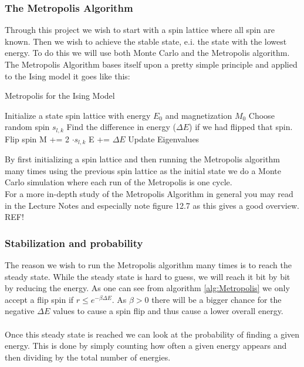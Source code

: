 \documentclass{article}
\newcommand{\husk}[1]{\color{red} #1 \color{black}}
\begin{document}
\subsubsection*{The Metropolis Algorithm}
Through this project we wish to start with a spin lattice where all spin are known. Then we wish to achieve the stable state, e.i. the state with the lowest energy. To do this we will use both Monte Carlo and the Metropolis algorithm. The Metropolis Algorithm bases itself upon a pretty simple principle and applied to the Ising model it goes like this: \\
\begin{algorithm}[H]
\small
\caption{Metropolis for the Ising Model}\label{alg:Metropolis}
\begin{algorithmic}[1]
\State Initialize a state spin lattice with energy $E_0$ and magnetization $M_0$ 
 
\State Choose random spin $s_{l,k}$
\State Find the difference in energy ($\Delta E$) if we had flipped that spin.
 
\State Flip spin
\State M += 2 $\cdot s_{l,k}$
\State E += $\Delta E$
\EndIf
\EndFor
\EndFor
\State Update Eigenvalues
\end{algorithmic}
\end{algorithm}
By first initializing a spin lattice and then running the Metropolis algorithm many times using the previous spin lattice as the initial state we do a Monte Carlo simulation where each run of the Metropolis is one cycle. \\
For a more in-depth study of the Metropolis Algorithm in general you may read in the Lecture Notes and especially note figure 12.7 as this gives a good overview. \husk{REF!}
\subsubsection*{Stabilization and probability}
The reason we wish to run the Metropolis algorithm many times is to reach the steady state. While the steady state is hard to guess, we will reach it bit by bit by reducing the energy. As one can see from algorithm \ref{alg:Metropolis} we only accept a flip spin if $r \leq e^{-\beta \Delta E}$. As $\beta > 0$ there will be a bigger chance for the negative $\Delta E$ values to cause a spin flip and thus cause a lower overall energy. \\ \\
Once this steady state is reached we can look at the probability of finding a given energy. This is done by simply counting how often a given energy appears and then dividing by the total number of energies.
\end{document}
